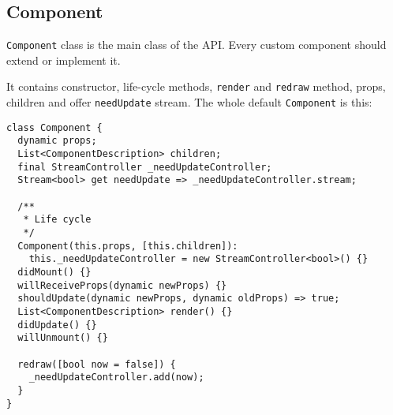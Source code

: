 \documentclass[oneside, 12pt]{book}
\begin{document}


  \subsection{Component}\label{subsec:our-api-component}

    \texttt{Component} class is the main class of the API.
    Every custom component should extend or implement it. 

    It contains constructor, life-cycle methods, \texttt{render} and \texttt{redraw} method, props, children and offer \texttt{needUpdate} stream.
    The whole default \texttt{Component} is this: 
\begin{verbatim}
class Component {
  dynamic props;
  List<ComponentDescription> children;
  final StreamController _needUpdateController;
  Stream<bool> get needUpdate => _needUpdateController.stream; 

  /**
   * Life cycle
   */
  Component(this.props, [this.children]): 
    this._needUpdateController = new StreamController<bool>() {}
  didMount() {}
  willReceiveProps(dynamic newProps) {}
  shouldUpdate(dynamic newProps, dynamic oldProps) => true;
  List<ComponentDescription> render() {}
  didUpdate() {}
  willUnmount() {}
  
  redraw([bool now = false]) {
    _needUpdateController.add(now);
  }
}
\end{verbatim}
\end{document}
